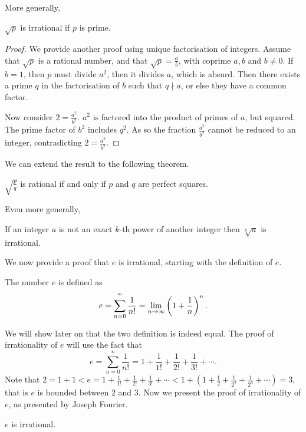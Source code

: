 \documentclass[main.tex]{subfiles}
\begin{document}
		More generally,
		\begin{theorem}
			$\sqrt{p}$ is irrational if $p$ is prime.
		\end{theorem}
		\begin{proof}
			We provide another proof using unique factorisation of integers.
			Assume that $\sqrt{p}$ is a rational number, and that $\sqrt{p} = \frac{a}{b}$, with coprime $a, b$ and $b \neq 0$. If $b = 1$, then $p$ must divide $a^2$, then it divides $a$, which is absurd. Then there exists a prime $q$ in the factorisation of $b$ such that $q \nmid a$, or else they have a common factor.
			
			Now consider $2 = \frac{a^2}{b^2}$. $a^2$ is factored into the product of primes of $a$, but squared. The prime factor of $b^2$ includes $q^2$. As so the fraction $\frac{a^2}{b^2}$ cannot be reduced to an integer, contradicting $2 = \frac{a^2}{b^2}$.
		\end{proof}
		We can extend the result to the following theorem.
		\begin{theorem}
			$\sqrt{\frac{p}{q}}$ is rational if and only if $p$ and $q$ are perfect squares.
		\end{theorem}
		Even more generally,
		\begin{theorem}
			If an integer $a$ is not an exact $k$-th power of another integer then $\sqrt[k]{a}$ is irrational.
		\end{theorem}
		We now provide a proof that $e$ is irrational, starting with the definition of $e$.
		\begin{definition}
			The number $e$ is defined as
			\begin{equation*}
				 e = \sum_{n = 0}^{^\infty}\frac{1}{n!} = \lim_{n \rightarrow \infty}\left( 1 + \frac{1}{n}\right)^n.
			\end{equation*}
		\end{definition}
		We will show later on that the two definition is indeed equal. The proof of irrationality of $e$ will use the fact that 
		\begin{equation*}
			e = \sum_{n = 0}^{^\infty}\frac{1}{n!} = 1 + \frac{1}{1!} + \frac{1}{2!} + \frac{1}{3!} + \cdots.
		\end{equation*}
		Note that $2 = 1 + 1 < e = 1 + \frac{1}{1!} + \frac{1}{2!} + \frac{1}{3!} + \cdots < 1 + \left( 1 + \frac{1}{2} + \frac{1}{2^2} + \frac{1}{2^3} + \cdots\right) = 3$, that is $e$ is bounded between 2 and 3. Now we present the proof of irrationality of $e$, as presented by Joseph Fourier.
		\begin{theorem}
			$e$ is irrational.
		\end{theorem}
\end{document}
